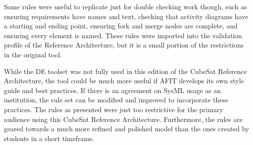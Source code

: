 Some rules were useful to replicate just for double checking work though, such as ensuring requirements have names and text, checking that activity diagrams have a starting and ending point, ensuring fork and merge nodes are complete, and ensuring every element is named. These rules were imported into the validation profile of the Reference Architecture, but it is a small portion of the restrictions in the original tool.

While the DE toolset was not fully used in this edition of the CubeSat Reference Architecture, the tool could be much more useful if AFIT develops its own style guide and best practices. If there is an agreement on SysML usage as an institution, the rule set can be modified and improved to incorporate these practices. The rules as presented were just too restrictive for the primary audience using this CubeSat Reference Architecture. Furthermore, the rules are geared towards a much more refined and polished model than the ones created by students in a short timeframe. 